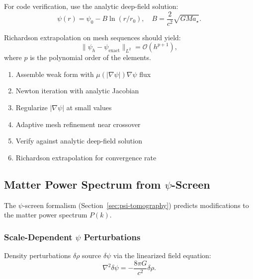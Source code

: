 For code verification, use the analytic deep-field solution:
\begin{equation}
\psi(r) = \psi_0 - B\ln(r/r_0), \quad B = \frac{2}{c^2}\sqrt{GMa_\star}.
\end{equation}

Richardson extrapolation on mesh sequences should yield:
\begin{equation}
\|\psi_h - \psi_{\mathrm{exact}}\|_{L^2} = \mathcal{O}(h^{p+1}),
\end{equation}
where $p$ is the polynomial order of the elements.

\begin{tcolorbox}[colback=blue!5!white, colframe=blue!50!black, title=FEM Implementation Checklist]
\begin{enumerate}[nosep]
\item Assemble weak form with $\mu(|\nabla\psi|)\nabla\psi$ flux
\item Newton iteration with analytic Jacobian
\item Regularize $|\nabla\psi|$ at small values
\item Adaptive mesh refinement near crossover
\item Verify against analytic deep-field solution
\item Richardson extrapolation for convergence rate
\end{enumerate}
\end{tcolorbox}

\subsection{Matter Power Spectrum from $\psi$-Screen}\label{app:power-spectrum}

The $\psi$-screen formalism (Section~\ref{sec:psi-tomography}) predicts 
modifications to the matter power spectrum $P(k)$.

\subsubsection{Scale-Dependent $\psi$ Perturbations}

Density perturbations $\delta\rho$ source $\delta\psi$ via the linearized 
field equation:
\begin{equation}
\nabla^2\delta\psi = -\frac{8\pi G}{c^2}\delta\rho.
\end{equation}

